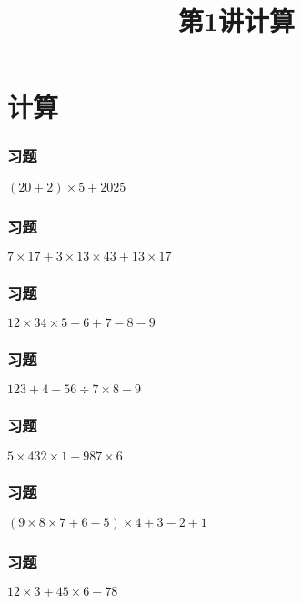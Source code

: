 \section{计算}

\title[第1讲\quad 计算]{第1讲\quad 计算} 
\author{}
\date{}
\begin{frame}
    \titlepage
\end{frame}

\begin{frame}
    \frametitle{习题\theframecounter}
    \vspace*{-3cm}
    \centering\textit{\Large $(20+2)\times 5 + 2025$}
\end{frame}

\begin{frame}
    \frametitle{习题\theframecounter}
    \vspace*{-3cm}
    \centering\textit{\Large $7\times 17 + 3\times 13\times 43 + 13\times 17$}
\end{frame}

\begin{frame}
    \frametitle{习题\theframecounter}
    \vspace*{-3cm}
    \centering\textit{\Large $12\times 34\times 5 - 6 + 7 - 8 - 9$}
\end{frame}

\begin{frame}
    \frametitle{习题\theframecounter}
    \vspace*{-3cm}    \centering\textit{\Large $123 + 4 - 56\div 7\times 8 - 9$}
\end{frame}

\begin{frame}
    \frametitle{习题\theframecounter}
    \vspace*{-3cm}    \centering\textit{\Large $5\times 432\times 1 - 98 7\times 6$}
\end{frame}

\begin{frame}
    \frametitle{习题\theframecounter}
    \vspace*{-3cm}    \centering\textit{\Large $(9\times 8\times 7 + 6 - 5)\times 4 + 3 -2 +1$}
\end{frame}

\begin{frame}
    \frametitle{习题\theframecounter} 
    \vspace*{-3cm}   \centering\textit{\Large $12\times 3 + 45\times 6 - 78$}
\end{frame}

